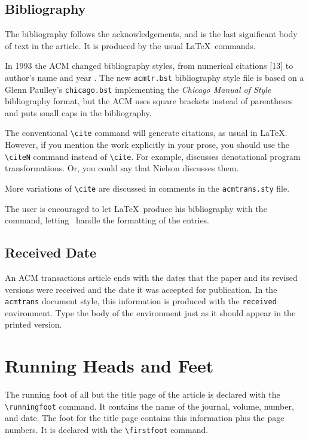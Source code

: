 \subsection{Bibliography}

The bibliography follows the acknowledgements, and is the last
significant body of text in the article.  It is produced by the usual
\LaTeX\ commands.  

In 1993 the ACM changed bibliography styles, from numerical citations [13]
to author's name and year \cite{7(3):359}.  The new \verb|acmtr.bst|
bibliography style file is based on a Glenn Paulley's \verb|chicago.bst|
implementing the {\it Chicago Manual of Style} bibliography format, 
but the ACM uses square brackets instead of parentheses and puts small
caps in the bibliography.

The conventional \verb|\cite| command will generate citations, as usual
in \LaTeX.  However, if you mention
the work explicitly in your prose, you should use the \verb|\citeN|
command instead of \verb|\cite|.  For example, 
discusses denotational program transformations.  Or, you could say
that Nielson \citeyear{7(3):359} discusses them.

More variations of \verb|\cite| are discussed in comments in the
\verb|acmtrans.sty| file.

The user is encouraged to let \LaTeX\ produce his bibliography
with the \verb|| command, letting \BibTeX\ handle the
formatting of the entries.

\subsection{Received Date}

An ACM transactions article ends with the dates that the paper and its
revised versions were received and the date it was accepted for
publication.  In the {\tt acmtrans} document style, this information is
produced with the {\tt received} environment.  Type the body of the
environment just as it should appear in the printed version.

\section{Running Heads and Feet}

The running foot of all but the title page of the article is declared
with the \linebreak
\verb|\runningfoot| command.  It contains the name of the
journal, volume, number, and date.  The foot for the title page
contains this information plus the page numbers.  It is declared
with the \verb|\firstfoot| command.

